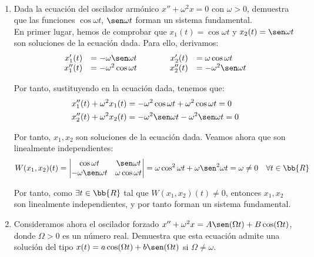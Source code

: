 \begin{ejercicio}\label{ej:4.11}~
    \begin{enumerate}
        \item Dada la ecuación del oscilador armónico $x'' + \omega^2 x = 0$ con $\omega > 0$, demuestra que las funciones $\cos \omega t$, $\sen \omega t$ forman un sistema fundamental.\\
        
        En primer lugar, hemos de comprobar que $x_1(t)=\cos \omega t$ y $x_2(t)=\sen \omega t$ son soluciones de la ecuación dada. Para ello, derivamos:
        \begin{equation*}
            \begin{array}{rlcrl}
                x_1'(t)&=-\omega \sen \omega t & \qquad & x_2'(t)&=\omega \cos \omega t\\
                x_1''(t)&=-\omega^2 \cos \omega t & \qquad & x_2''(t)&=-\omega^2 \sen \omega t
            \end{array}
        \end{equation*}

        Por tanto, sustituyendo en la ecuación dada, tenemos que:
        \begin{align*}
            x_1''(t)+\omega^2 x_1(t)&=-\omega^2 \cos \omega t + \omega^2 \cos \omega t=0\\
            x_2''(t)+\omega^2 x_2(t)&=-\omega^2 \sen \omega t - \omega^2 \sen \omega t=0
        \end{align*}

        Por tanto, $x_1,x_2$ son soluciones de la ecuación dada. Veamos ahora que son linealmente independientes:
        \begin{equation*}
            W(x_1,x_2)(t)=\begin{vmatrix}
                \cos \omega t & \sen \omega t\\
                -\omega \sen \omega t & \omega \cos \omega t
            \end{vmatrix}=\omega\cos^2 \omega t + \omega \sen^2 \omega t=\omega\neq 0 \quad \forall t\in \bb{R}
        \end{equation*}

        Por tanto, como $\exists t\in \bb{R}$ tal que $W(x_1,x_2)(t)\neq 0$, entonces $x_1,x_2$ son linealmente independientes, y por tanto forman un sistema fundamental.
        \item Consideramos ahora el oscilador forzado $x'' + \omega^2 x = A \sen(\Omega t) + B \cos(\Omega t)$, donde $\Omega > 0$ es un número real. Demuestra que esta ecuación admite una solución del tipo $x(t) = a \cos(\Omega t) + b \sen(\Omega t)$ si $\Omega \neq \omega$.\\
        

\end{enumerate}
\end{ejercicio}

